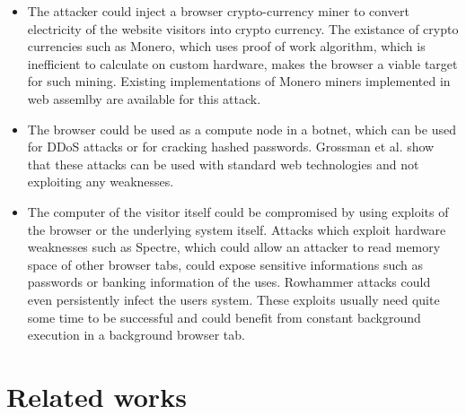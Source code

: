 \documentclass[
	ngerman,
	ruledheaders=section,%
	class=report,%
	thesis={type=bachelor},%
	accentcolor=9c,%
	custommargins=true,%
	marginpar=false,%
	parskip=half-,%
	fontsize=11pt,%
]{tudapub}
\begin{document}
  \begin{itemize}
  \item The attacker could inject a browser crypto-currency miner to convert electricity of the website visitors into crypto currency. The existance of crypto currencies such as Monero, which uses proof of work algorithm, which is inefficient to calculate on custom hardware, makes the browser a viable target for such mining. Existing implementations of Monero miners implemented in web assemlby are available for this attack.
  \item The browser could be used as a compute node in a botnet, which can be used for DDoS attacks or for cracking hashed passwords. Grossman et al.\cite{grossmann2013million} show that these attacks can be used with standard web technologies and not exploiting any weaknesses.
  \item The computer of the visitor itself could be compromised by using exploits of the browser or the underlying system itself. Attacks which exploit hardware weaknesses such as Spectre\cite{Kocher2018spectre}, which could allow an attacker to read memory space of other browser tabs, could expose sensitive informations such as passwords or banking information of the uses. Rowhammer\cite{rowhammer} attacks could even persistently infect the users system. These exploits usually need quite some time to be successful and could benefit from constant background execution in a background browser tab.
  \end{itemize}

  

  \section{Related works}
\end{document}
